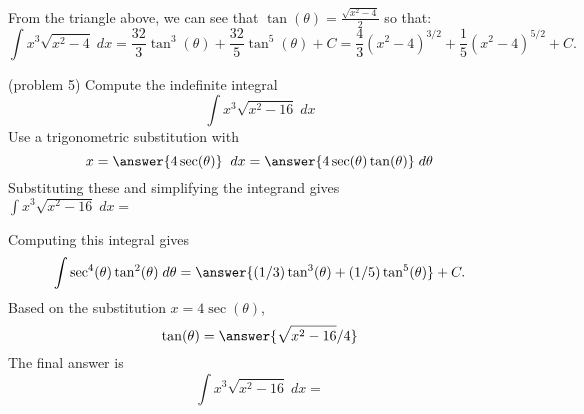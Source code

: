 \documentclass[handout]{ximera}
\begin{document}
\begin{example}[example 5]
From the triangle above, we can see that $\tan(\theta) = \frac{\sqrt{x^2-4}}{2}$ so that:
\[
\int x^3\sqrt{x^2-4} \; dx =  \frac{32}{3} \tan^3(\theta) + \frac{32}{5} \tan^5(\theta) + C =  \frac43 (x^2 - 4)^{3/2} + 
\frac{1}{5} (x^2 - 4)^{5/2} + C.
\]

\end{example}



\begin{problem}(problem 5)
Compute the indefinite integral
\[
\int   x^3 \sqrt{x^2 - 16} \; dx
\]
Use a trigonometric substitution with\\
\[
x = \answer{4\sec(\theta)} \;\; dx = \answer{4\sec(\theta)\tan(\theta)} \; d\theta
\]
Substituting these and simplifying the integrand gives\\
$\displaystyle{\int  x^3 \sqrt{ x^2 -16}\; dx =}$\\
\begin{multipleChoice}
\end{multipleChoice}

Computing this integral gives
\[
\int \sec^4(\theta)\tan^2(\theta) \; d\theta = \answer{(1/3)\tan^3(\theta)+ (1/5)\tan^5(\theta) } + C.
\]
Based on the substitution $x = 4\sec(\theta)$, \\
\[
\tan(\theta) = \answer{\sqrt{x^2 -16}/4}
\]
The final answer is
\[
\int   x^3\sqrt{x^2 -16}\; dx = 
\]

\begin{center}
\begin{multipleChoice}
\end{multipleChoice}
\end{center}


\end{problem}
\end{document}
